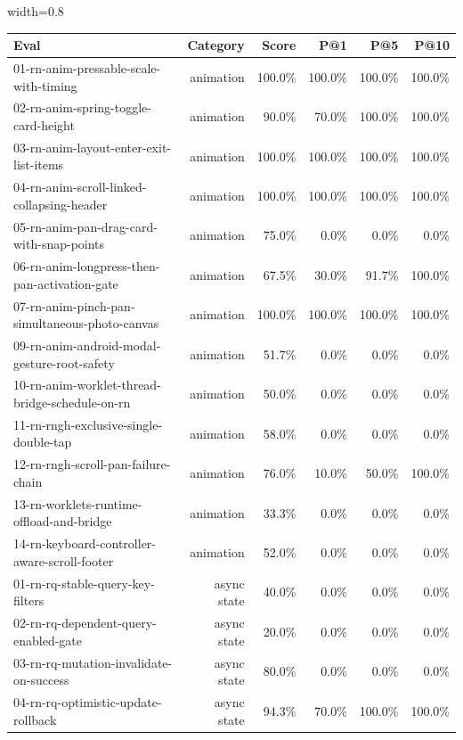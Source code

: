 \begin{table}[htbp]
\centering
\begin{adjustbox}{width=0.8\textwidth}
\begin{tabular}{lrrrrr}
\toprule
Eval & Category & Score & P@1 & P@5 & P@10 \\
\midrule
01-rn-anim-pressable-scale-with-timing & animation & 100.0\% & 100.0\% & 100.0\% & 100.0\% \\
02-rn-anim-spring-toggle-card-height & animation & 90.0\% & 70.0\% & 100.0\% & 100.0\% \\
03-rn-anim-layout-enter-exit-list-items & animation & 100.0\% & 100.0\% & 100.0\% & 100.0\% \\
04-rn-anim-scroll-linked-collapsing-header & animation & 100.0\% & 100.0\% & 100.0\% & 100.0\% \\
05-rn-anim-pan-drag-card-with-snap-points & animation & 75.0\% & 0.0\% & 0.0\% & 0.0\% \\
06-rn-anim-longpress-then-pan-activation-gate & animation & 67.5\% & 30.0\% & 91.7\% & 100.0\% \\
07-rn-anim-pinch-pan-simultaneous-photo-canvas & animation & 100.0\% & 100.0\% & 100.0\% & 100.0\% \\
09-rn-anim-android-modal-gesture-root-safety & animation & 51.7\% & 0.0\% & 0.0\% & 0.0\% \\
10-rn-anim-worklet-thread-bridge-schedule-on-rn & animation & 50.0\% & 0.0\% & 0.0\% & 0.0\% \\
11-rn-rngh-exclusive-single-double-tap & animation & 58.0\% & 0.0\% & 0.0\% & 0.0\% \\
12-rn-rngh-scroll-pan-failure-chain & animation & 76.0\% & 10.0\% & 50.0\% & 100.0\% \\
13-rn-worklets-runtime-offload-and-bridge & animation & 33.3\% & 0.0\% & 0.0\% & 0.0\% \\
14-rn-keyboard-controller-aware-scroll-footer & animation & 52.0\% & 0.0\% & 0.0\% & 0.0\% \\
01-rn-rq-stable-query-key-filters & async state & 40.0\% & 0.0\% & 0.0\% & 0.0\% \\
02-rn-rq-dependent-query-enabled-gate & async state & 20.0\% & 0.0\% & 0.0\% & 0.0\% \\
03-rn-rq-mutation-invalidate-on-success & async state & 80.0\% & 0.0\% & 0.0\% & 0.0\% \\
04-rn-rq-optimistic-update-rollback & async state & 94.3\% & 70.0\% & 100.0\% & 100.0\% \\

\end{tabular}
\end{adjustbox}
\end{table}
